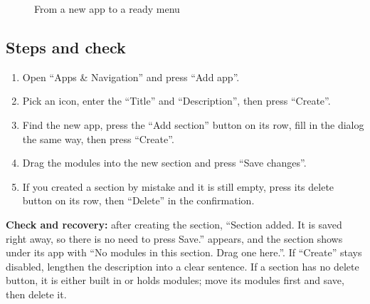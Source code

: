 \begin{figure}[H]
\centering
{}
\rclegend
\caption{From a new app to a ready menu}
\label{fig:builder-navigation-apps-sections-flow}
\end{figure}

\subsection{Steps and check}
\begin{enumerate}
\item Open “Apps \& Navigation” and press “Add app”.
\item Pick an icon, enter the “Title” and “Description”, then press “Create”.
\item Find the new app, press the “Add section” button on its row, fill in the dialog the same way, then press “Create”.
\item Drag the modules into the new section and press “Save changes”.
\item If you created a section by mistake and it is still empty, press its delete button on its row, then “Delete” in the confirmation.
\end{enumerate}

\textbf{Check and recovery:} after creating the section, “Section added. It is saved right away, so there is no need to press Save.” appears, and the section shows under its app with “No modules in this section. Drag one here.”. If “Create” stays disabled, lengthen the description into a clear sentence. If a section has no delete button, it is either built in or holds modules; move its modules first and save, then delete it.

\clearpage
